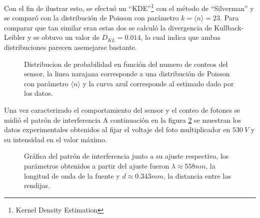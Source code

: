 \documentclass[%
 reprint,
 amsmath,amssymb,
 aps,
]{revtex4-1}
\begin{document}
{Con el fin de ilustrar esto, se efectuó un ``KDE''\footnote{Kernel Density Estimation} con el método de ``Silverman'' y se comparó con la distribución de Poisson con parámetro $k=\langle n\rangle=23$. Para comparar que tan similar eran estas dos se calculó la divergencia de Kullback-Leibler y se obtuvo un valor de $D_{KL}=0.014$, lo cual indica que ambas distribuciones parecen asemejarse bastante.

\begin{figure}[h]
\caption{\label{distribucion} Distribucion de probabilidad en función del numero de conteos del sensor, la linea narajana corresponde a una distribución de Poisson con parámetro $\langle n\rangle$ y la curva azul corresponde al estimado dado por los datos.}
\end{figure}
Una vez caracterizado el comportamiento del sensor y el conteo de fotones se midió el patrón de interferencia A continuación en la figura \ref{interferencia_laserverde} se muestran los datos experimentales obtenidos al fijar el voltaje del foto multiplicador en $530\ V$ y su intensidad en el valor máximo.
\begin{figure}[h]
\caption{\label{interferencia_laserverde} Gráfica del patrón de interferencia junto a su ajuste respectivo, los parámetros obtenidos a partir del ajuste fueron $\lambda\approx 558 nm$, la longitud de onda de la fuente y $d\approx 0.343 mm$, la distancia entre las rendijas.}
\end{figure}


}
\end{document}
